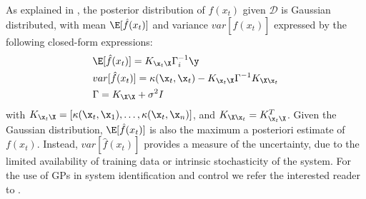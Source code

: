 As explained in \cite{rasmussen2003gps_for_ml}, the posterior distribution of $f(x_t)$ given $\mathcal{D}$ is Gaussian distributed, with mean $\E[\hat{f}(x_t)]$ and variance $var[\hat{f}(x_t)]$ expressed by the following closed-form expressions:
\begin{subequations}
    \begin{align}
        &\E[\hat{f}(x_t)] = K_{{\x}_t {\X}} \Gamma_i^{-1} \y    \label{eq:gp_regression_formulas-mean}\\
        &var[\hat{f}(x_t)] = \kappa ({\x}_t, {\x}_t) - K_{{\x}_t {\X}} \Gamma^{-1} K_{{\X} {\x}_t}\label{eq:gp_regression_formulas-var} \\
        &\Gamma = K_{{\X} {\X}} + \sigma^2 I \nonumber
    \end{align}
    \label{eq:gp_regression_formulas}
\end{subequations}
with $ K_{{\x}_t {\X}} = [\kappa(\x_t, \x_1), \dots, \kappa(\x_t, \x_n)]$, and $ K_{{\X} {\x}_t} = K_{{\x}_t {\X}}^T$.
Given the Gaussian distribution, $\E[\hat{f}(x_t)]$ is also the maximum a posteriori estimate of $f(x_t)$. Instead, $var[\hat{f}(x_t)]$ provides a measure of the uncertainty, due to the limited availability of training data or intrinsic stochasticity of the system. 
For the use of GPs in system identification and control we refer the interested reader to
\cite{kernel_methods_and_gp_control_systems_magazine}.